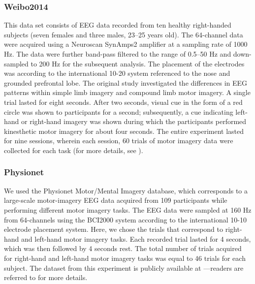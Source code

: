 \documentclass{ieeeaccess}
\begin{document}
    \subsubsection{Weibo2014}
    This data set consists of EEG data recorded from ten healthy right-handed subjects (seven females and three males, 23–25 years old). The 64-channel data were acquired using a Neuroscan SynAmps2 amplifier at a sampling rate of 1000 Hz. The data were further band-pass filtered to the range of 0.5–50 Hz and down-sampled to 200 Hz for the subsequent analysis. The placement of the electrodes was according to the international 10-20 system referenced to the nose and grounded prefrontal lobe.  The original study investigated the differences in EEG patterns within simple limb imagery and compound limb motor imagery. A single trial lasted for eight seconds. After two seconds, visual cue in the form of a red circle was shown to participants for a second; subsequently, a cue indicating left-hand or right-hand imagery was shown during which the participants performed kinesthetic motor imagery for about four seconds.  The entire experiment lasted for nine sessions, wherein each session, 60 trials of motor imagery data were collected for each task (for more details, see \cite{yi2014evaluation}). 
    
    \subsubsection{Physionet}
  
 We used the Physionet Motor/Mental Imagery database, which corresponds to a large-scale motor-imagery EEG data acquired from 109 participants while performing different motor imagery tasks. The EEG data were sampled at 160 Hz from 64-channels using the BCI2000 system according to the international 10-10 electrode placement system. 
    Here, we chose the trials that correspond to right-hand and left-hand motor imagery tasks. Each recorded trial lasted for 4 seconds, which was then followed by 4 seconds rest. The total number of trials acquired for right-hand and left-hand motor imagery tasks was equal to 46 trials for each subject. The dataset from this experiment is publicly available at \cite{Physiobank}---readers are referred to \cite{goldberger2000physiobank, schalk2004bci2000} for more details.
     
\end{document}
